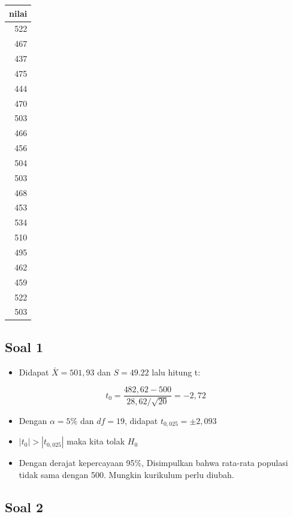 \documentclass[
  letterpaper,
  DIV=11,
  numbers=noendperiod]{scrartcl}
\providecommand{\tightlist}{%
  \setlength{\itemsep}{0pt}\setlength{\parskip}{0pt}}\usepackage{longtable,booktabs,array}
\begin{document}
\begin{tabular}[t]{r}
\hline
nilai\\
\hline
522\\
\hline
467\\
\hline
437\\
\hline
475\\
\hline
444\\
\hline
470\\
\hline
503\\
\hline
466\\
\hline
456\\
\hline
504\\
\hline
503\\
\hline
468\\
\hline
453\\
\hline
534\\
\hline
510\\
\hline
495\\
\hline
462\\
\hline
459\\
\hline
522\\
\hline
503\\
\hline
\end{tabular}

\hypertarget{soal-1-1}{%
\subsection{Soal 1}\label{soal-1-1}}

\begin{itemize}
\tightlist
\item
  Didapat \(\bar{X}=501,93\) dan \(S=49.22\) lalu hitung t:
\end{itemize}

\[
t_0=\frac{482,62-500}{28,62/\sqrt{20}}=-2,72
\]

\begin{itemize}
\item
  Dengan \(\alpha=5\%\) dan \(df=19\), didapat \(t_{0,025}=\pm2,093\)
\item
  \(|t_0| > |t_{0,025}|\) maka kita tolak \(H_0\)
\item
  Dengan derajat kepercayaan 95\%, Disimpulkan bahwa rata-rata populasi
  tidak sama dengan 500. Mungkin kurikulum perlu diubah.
\end{itemize}

\hypertarget{soal-2}{%
\subsection{Soal 2}\label{soal-2}}
\end{document}
